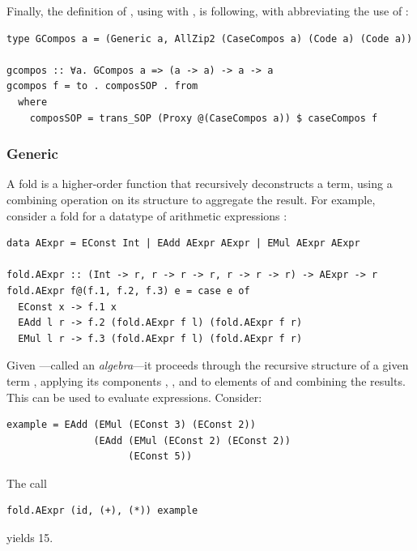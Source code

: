 \documentclass[sigplan,screen,review,anonymous]{acmart}
\begin{document}
Finally, the definition of , using  with , is following, with  abbreviating the use of :
\begin{lstlisting}[style=fancy]
type GCompos a = (Generic a, AllZip2 (CaseCompos a) (Code a) (Code a))

gcompos :: ∀a. GCompos a => (a -> a) -> a -> a
gcompos f = to . composSOP . from
  where
    composSOP = trans_SOP (Proxy @(CaseCompos a)) $ caseCompos f
\end{lstlisting}

\subsubsection{Generic }

A fold is a higher-order function that recursively deconstructs a term, using a combining operation on its structure to aggregate the result. For example, consider a fold for a datatype of arithmetic expressions :
\begin{lstlisting}[style=fancy]
data AExpr = EConst Int | EAdd AExpr AExpr | EMul AExpr AExpr

fold.AExpr :: (Int -> r, r -> r -> r, r -> r -> r) -> AExpr -> r
fold.AExpr f@(f.1, f.2, f.3) e = case e of
  EConst x -> f.1 x
  EAdd l r -> f.2 (fold.AExpr f l) (fold.AExpr f r)
  EMul l r -> f.3 (fold.AExpr f l) (fold.AExpr f r)
\end{lstlisting}
Given ---called an \emph{algebra}---it proceeds through the recursive structure of a given term , applying its components , , and  to elements of  and combining the results. This can be used to evaluate expressions. Consider:
\begin{lstlisting}[style=fancy]
example = EAdd (EMul (EConst 3) (EConst 2))
               (EAdd (EMul (EConst 2) (EConst 2))
                     (EConst 5))
\end{lstlisting}
The call
\begin{lstlisting}[style=fancy]
fold.AExpr (id, (+), (*)) example
\end{lstlisting}
yields 15.
\end{document}
